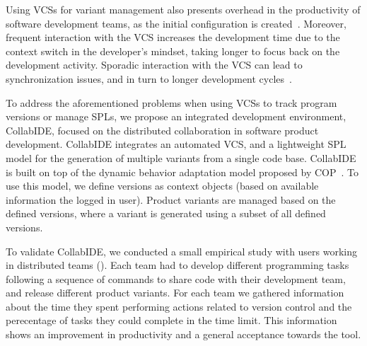 Using \acp{VCS} for variant management also presents overhead in the productivity of software development teams, as the initial configuration is created~\cite{niu14}.
Moreover, frequent interaction with the \ac{VCS} increases the development time due to the context switch in the developer's mindset, taking longer to focus back on the development activity. Sporadic interaction with the \ac{VCS} can lead to synchronization issues, and in turn to longer development cycles~\cite{schwagerl15}.  

To address the aforementioned problems when using \acp{VCS} to track program versions or manage \acp{SPL}, we propose an integrated development environment, CollabIDE, focused on the distributed  collaboration in software product development. CollabIDE integrates an automated \ac{VCS}, and a lightweight \ac{SPL} model for the generation of multiple variants from a single code base. 
CollabIDE is built on top of the dynamic behavior adaptation model proposed by \ac{COP}~\cite{salvaneschi+12survey}. To use this model, we define versions as context objects (based on available information \eg the logged in user).
Product variants are managed based on the defined versions, where a variant is generated using a subset of all defined versions.

To validate CollabIDE, we conducted a small empirical study with users 
working in distributed teams (). Each team had to develop different programming tasks following a sequence of commands to share code with their development team, and release different product variants. For each team we gathered information about the time they spent performing actions related to version control and the perecentage of tasks they could complete in the time limit. This information shows an improvement in productivity and a general acceptance towards the tool.
 



\endinput

With CollabIDE, we aim to solve the overhead problems that exists in these development models with 
features that aim to reduce the time developers must spend doing actions related to version control or 
setting up a project that uses \acp{SPL}.
